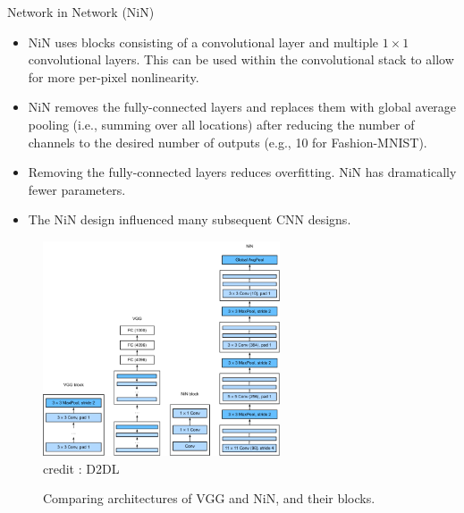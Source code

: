 \begin{vbframe}{Network in Network (NiN)}
  \begin{itemize}
    \item NiN uses blocks consisting of a convolutional layer and multiple $1 \times 1$ convolutional layers. This can be used within the convolutional stack to allow for more per-pixel nonlinearity.
    \item NiN removes the fully-connected layers and replaces them with global average pooling (i.e., summing over all locations) after reducing the number of channels to the desired number of outputs (e.g., 10 for Fashion-MNIST).
    \item Removing the fully-connected layers reduces overfitting. NiN has dramatically fewer parameters.
    \item The NiN design influenced many subsequent CNN designs.
  \end{itemize}
\framebreak
  \begin{figure}
  \centering
    \includegraphics[width=7cm]{plots/moderncnn/nin.png}
    \tiny{\\ credit : D2DL}
    \caption{Comparing architectures of VGG and NiN, and their blocks.}
  \end{figure}

\end{vbframe}





